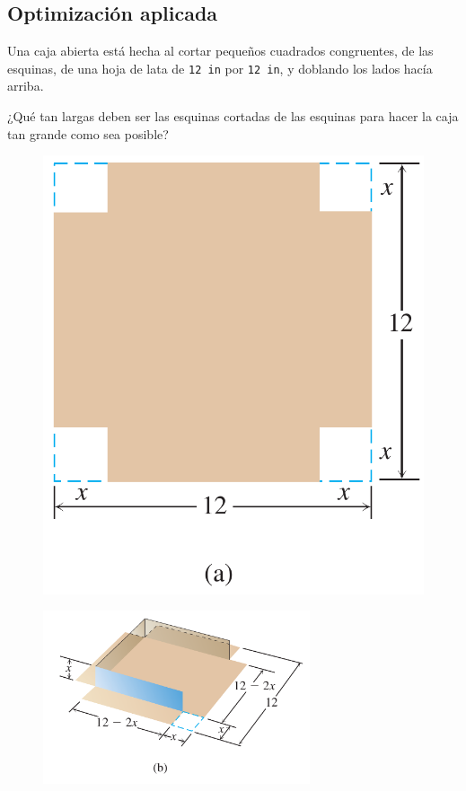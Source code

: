 \subsection{Optimización aplicada}


	\begin{resuelto}
		Una caja abierta está hecha al cortar pequeños cuadrados congruentes, de las esquinas, de una hoja de lata de \texttt{12 in} por \texttt{12 in}, y doblando los lados hacía arriba.

		¿Qué tan largas deben ser las esquinas cortadas de las esquinas para hacer la caja tan grande como sea posible?
	\end{resuelto}



	\begin{figure}
		\centering
		\includegraphics[height=0.7\textheight]{./calculo/thomas_04_36_a}
		\label{fig:thomas0436a}
	\end{figure}




	\begin{figure}
		\centering
		\includegraphics[width=0.7\textwidth]{./calculo/thomas_04_36_b}
		\label{fig:thomas0436b}
	\end{figure}





